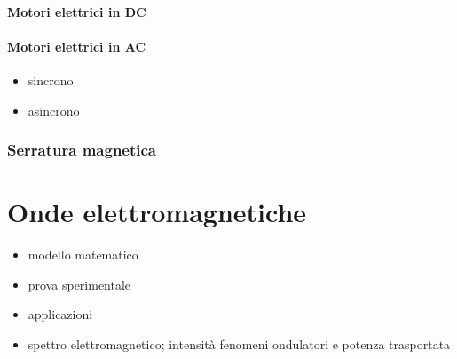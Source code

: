 \documentclass[letterpaper,10pt,italian]{jupyterBook}
\begin{document}
\subsubsection{Motori elettrici in DC}
\label{\detokenize{ch/electromagnetism/electric-machines:motori-elettrici-in-dc}}\label{\detokenize{ch/electromagnetism/electric-machines:physics-hs-electromagnetism-electric-machines-motor-dc}}

\subsubsection{Motori elettrici in AC}
\label{\detokenize{ch/electromagnetism/electric-machines:motori-elettrici-in-ac}}\label{\detokenize{ch/electromagnetism/electric-machines:physics-hs-electromagnetism-electric-machines-motor-ac}}\begin{itemize}
\item {} 
\sphinxAtStartPar
sincrono

\item {} 
\sphinxAtStartPar
asincrono

\end{itemize}


\subsection{Serratura magnetica}
\label{\detokenize{ch/electromagnetism/electric-machines:serratura-magnetica}}\label{\detokenize{ch/electromagnetism/electric-machines:physics-hs-electromagnetism-electric-machines-lock}}
\sphinxstepscope


\chapter{Onde elettromagnetiche}
\label{\detokenize{ch/electromagnetism/em-waves:onde-elettromagnetiche}}\label{\detokenize{ch/electromagnetism/em-waves:physics-hs-electromagnetism-em-waves}}\label{\detokenize{ch/electromagnetism/em-waves::doc}}\begin{itemize}
\item {} 
\sphinxAtStartPar
modello matematico

\item {} 
\sphinxAtStartPar
prova sperimentale

\item {} 
\sphinxAtStartPar
applicazioni

\item {} 
\sphinxAtStartPar
spettro elettromagnetico; intensità fenomeni ondulatori e potenza trasportata

\end{itemize}
\end{document}
